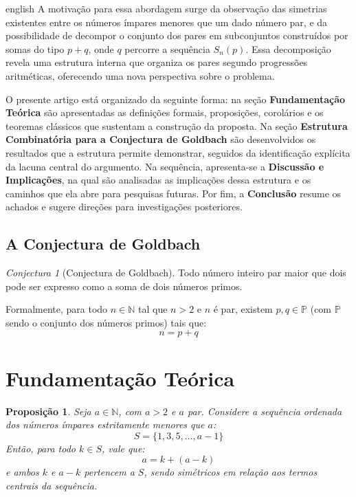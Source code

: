 \documentclass[a4paper,11pt]{article}
\newtheorem{proposition}[theorem]{Proposição}
\theoremstyle{definition}
\theoremstyle{remark}
\newtheorem{conjecture}{Conjectura}
\begin{document}
\begin{otherlanguage*}{english}
		A motivação para essa abordagem surge da observação das simetrias existentes
		entre os números ímpares menores que um dado número par, e da possibilidade
		de decompor o conjunto dos pares em subconjuntos construídos por somas do
		tipo \(p + q\), onde \(q\) percorre a sequência \(S_n(p)\). Essa
		decomposição revela uma estrutura interna que organiza os pares segundo
		progressões aritméticas, oferecendo uma nova perspectiva sobre o problema.
		
		O presente artigo está organizado da seguinte forma: na seção
		\textbf{Fundamentação Teórica} são apresentadas as definições formais,
		proposições, corolários e os teoremas clássicos que sustentam a construção
		da proposta. Na seção \textbf{Estrutura Combinatória para a Conjectura de
			Goldbach} são desenvolvidos os resultados que a estrutura permite
		demonstrar, seguidos da identificação explícita da lacuna central do
		argumento. Na sequência, apresenta-se a \textbf{Discussão e Implicações},
		na qual são analisadas as implicações dessa estrutura e os caminhos
		que ela abre para pesquisas futuras. Por fim, a \textbf{Conclusão} resume
		os achados e sugere direções para investigações posteriores.
		
		\subsection*{A Conjectura de Goldbach}
		\begin{conjecture}[Conjectura de Goldbach]
			Todo número inteiro par maior que dois pode ser expresso como a soma de
			dois números primos.
			
			Formalmente, para todo \(n \in \mathbb{N}\) tal que \(n > 2\) e \(n\) é
			par, existem \(p, q \in \mathbb{P}\) (com \(\mathbb{P}\) sendo o conjunto
			dos números primos) tais que:
			\[
			n = p + q
			\]
		\end{conjecture}
		
		\section{Fundamentação Teórica}
		
		\begin{proposition}\label{prop:simetria_impares}
			Seja $a \in \mathbb{N}$, com $a > 2$ e $a$ par. Considere a sequência
			ordenada dos números ímpares estritamente menores que $a$:
			\[
			S = \{1, 3, 5, \dotsc, a - 1\}
			\]
			Então, para todo $k \in S$, vale que:
			\[
			a = k + (a - k)
			\]
			e ambos $k$ e $a - k$ pertencem a $S$, sendo simétricos em relação aos
			termos centrais da sequência.
		\end{proposition}
		

\end{otherlanguage*}
\end{document}
